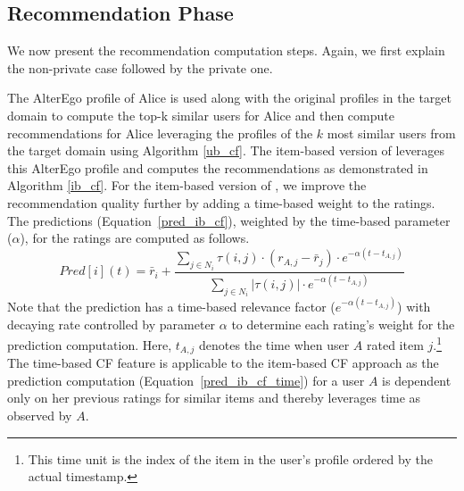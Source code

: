 


\subsection{Recommendation Phase}
We now present the recommendation computation steps. Again, we first explain the non-private case followed by the private one.

 The AlterEgo profile of Alice is used along with the original profiles in the target domain to compute the top-k similar users for Alice and then compute recommendations for Alice leveraging the profiles of the $k$ most similar users from the target domain using Algorithm \ref{ub_cf}. The item-based version of \crossrec leverages this AlterEgo profile and computes the recommendations as demonstrated in Algorithm \ref{ib_cf}. For the item-based version of \crossrec, we improve the recommendation quality further by adding a time-based weight to the ratings. The predictions (Equation~\ref{pred_ib_cf}), weighted by the time-based parameter ($\alpha$), for the ratings are computed as follows.
\begin{equation}
\label{pred_ib_cf_time}
Pred[i] (t)=\bar{r}_{i} +\frac{\sum_{j \in N_{i}} \tau(i,j) \cdot (r_{A,j}- \bar{r}_j) \cdot e^{-\alpha (t-t_{A,j})}}{\sum_{j \in N_{i}} |\tau(i,j)| \cdot e^{-\alpha (t-t_{A,j})} } 
\end{equation}
Note that the prediction has a time-based relevance factor ($e^{-\alpha (t-t_{A,j})}$) with decaying rate controlled by parameter $\alpha$ to determine each rating's weight for the prediction computation. Here, $t_{A,j}$ denotes the time when user $A$ rated item $j$.\footnote{This time unit is the index of the item in the user's profile ordered by the actual timestamp.} The time-based CF feature is applicable to the item-based CF approach as the prediction computation (Equation~\ref{pred_ib_cf_time}) for a user $A$ is dependent only on her previous ratings for similar items and thereby leverages time as observed by $A$.

